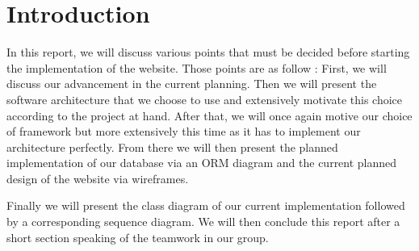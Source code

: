 
\section{Introduction}

In this report, we will discuss various points that must be decided before
starting the implementation of the website. Those points are as follow :
First, we will discuss our advancement in the current planning. Then we will present the software architecture that we choose to use and extensively motivate this choice according to the project at hand. After that, we will once again motive our choice of framework but more
extensively this time as it has to implement our architecture perfectly. From there we will then present the planned implementation of our database via an ORM diagram and the current planned design of the website via wireframes. \newline

Finally we will present the class diagram of our current implementation followed by a corresponding sequence diagram. We will then conclude this report after a short section speaking of the teamwork in our group.
